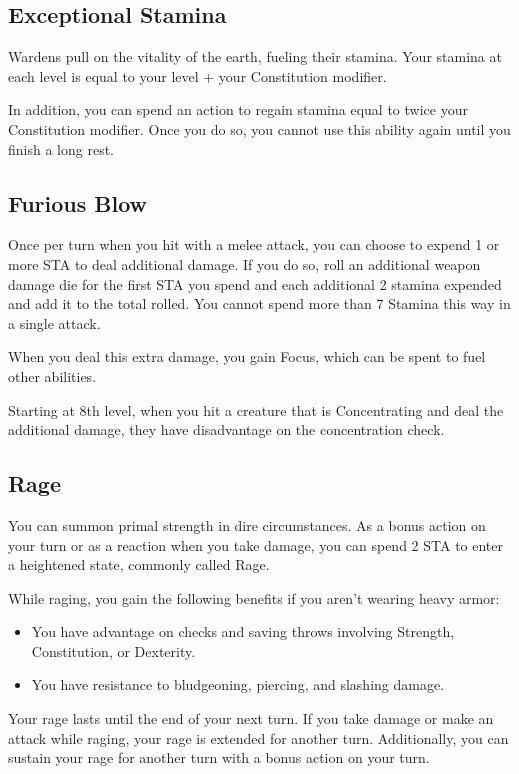 \subsection{Exceptional Stamina}
Wardens pull on the vitality of the earth, fueling their stamina. Your stamina at each level is equal to your level + your Constitution modifier.

In addition, you can spend an action to regain stamina equal to twice your Constitution modifier. Once you do so, you cannot use this ability again until you finish a long rest.

\subsection{Furious Blow}
Once per turn when you hit with a melee attack, you can choose to expend 1 or more STA to deal additional damage. If you do so, roll an additional weapon damage die for the first STA you spend and each additional 2 stamina expended and add it to the total rolled. You cannot spend more than 7 Stamina this way in a single attack.

When you deal this extra damage, you gain Focus, which can be spent to fuel other abilities.

Starting at 8th level, when you hit a creature that is Concentrating and deal the additional damage, they have disadvantage on the concentration check.

\subsection{Rage}

You can summon primal strength in dire circumstances. As a bonus action on your turn or as a reaction when you take damage, you can spend 2 STA to enter a heightened state, commonly called Rage.

While raging, you gain the following benefits if you aren’t wearing heavy armor:

\begin{itemize}
\item You have advantage on checks and saving throws involving Strength, Constitution, or Dexterity.
\item You have resistance to bludgeoning, piercing, and slashing damage.
\end{itemize}

Your rage lasts until the end of your next turn. If you take damage or make an attack while raging, your rage is extended for another turn. Additionally, you can sustain your rage for another turn with a bonus action on your turn.

